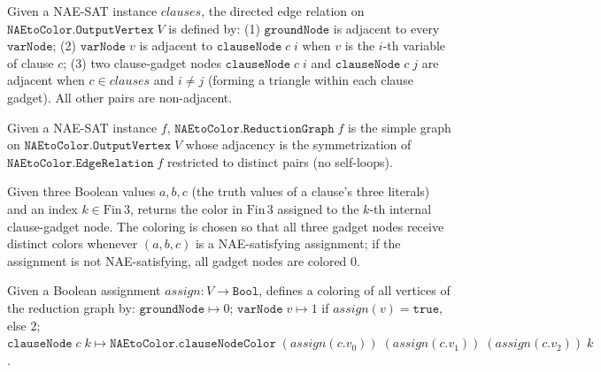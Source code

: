 \begin{definition}
\label{NAEtoColor.EdgeRelation}
\leanok
{}
Given a NAE-SAT instance $\mathit{clauses}$, the directed edge relation on
$\texttt{NAEtoColor.OutputVertex}\;V$ is defined by:
(1) $\mathtt{groundNode}$ is adjacent to every $\mathtt{varNode}$;
(2) $\mathtt{varNode}\;v$ is adjacent to $\mathtt{clauseNode}\;c\;i$ when $v$
is the $i$-th variable of clause $c$;
(3) two clause-gadget nodes $\mathtt{clauseNode}\;c\;i$ and
$\mathtt{clauseNode}\;c\;j$ are adjacent when $c \in \mathit{clauses}$ and
$i \neq j$ (forming a triangle within each clause gadget).
All other pairs are non-adjacent.
\end{definition}

\begin{definition}
\label{NAEtoColor.ReductionGraph}
\leanok
{}
Given a NAE-SAT instance $f$, $\texttt{NAEtoColor.ReductionGraph}\;f$ is the
simple graph on $\texttt{NAEtoColor.OutputVertex}\;V$ whose adjacency is the
symmetrization of $\texttt{NAEtoColor.EdgeRelation}\;f$ restricted to distinct
pairs (no self-loops).
\end{definition}

\begin{definition}
\label{NAEtoColor.clauseNodeColor}
\leanok
Given three Boolean values $a, b, c$ (the truth values of a clause's three
literals) and an index $k \in \mathrm{Fin}\,3$, returns the color in
$\mathrm{Fin}\,3$ assigned to the $k$-th internal clause-gadget node.
The coloring is chosen so that all three gadget nodes receive distinct colors
whenever $(a, b, c)$ is a NAE-satisfying assignment; if the assignment is
not NAE-satisfying, all gadget nodes are colored $0$.
\end{definition}

\begin{definition}
\label{NAEtoColor.naeColoring}
\leanok
{}
Given a Boolean assignment $\mathit{assign} : V \to \mathtt{Bool}$, defines a
coloring of all vertices of the reduction graph by:
$\mathtt{groundNode} \mapsto 0$;
$\mathtt{varNode}\;v \mapsto 1$ if $\mathit{assign}(v) = \mathtt{true}$, else $2$;
$\mathtt{clauseNode}\;c\;k \mapsto
\texttt{NAEtoColor.clauseNodeColor}\;(\mathit{assign}(c.v_0))\;(\mathit{assign}(c.v_1))\;(\mathit{assign}(c.v_2))\;k$.
\end{definition}

